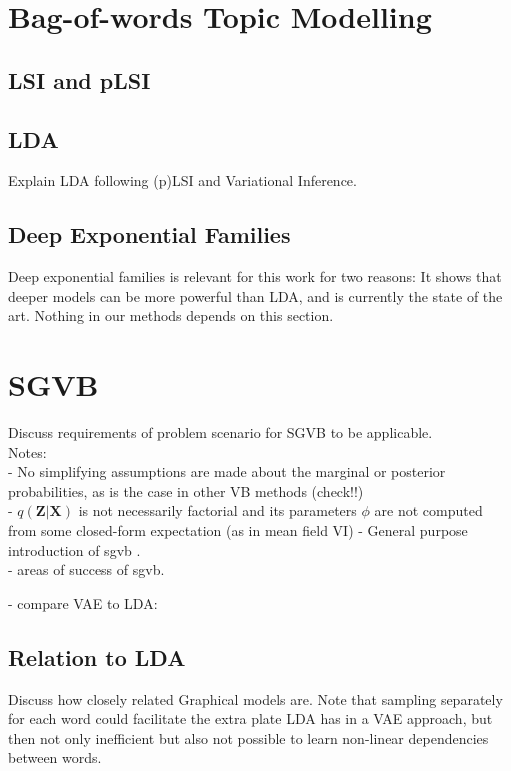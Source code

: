 \documentclass{report}
\begin{document}
\section{Bag-of-words Topic Modelling}

\subsection{LSI and pLSI}
\subsection{LDA}\label{LDA}
Explain LDA following (p)LSI and Variational Inference.
\subsection{Deep Exponential Families}\label{DEF}

Deep exponential families is relevant for this work for two reasons: It shows that deeper models can be more powerful than LDA, and is currently the state of the art. Nothing in our methods depends on this section.


\section{SGVB}\label{sgvb_section}

Discuss requirements of problem scenario for SGVB to be applicable. \\

Notes:\\
- No simplifying assumptions are made about the marginal or posterior probabilities, as is the case in other VB methods (check!!) \\
- $q(\mathbf{Z}|\mathbf{X})$ is not necessarily factorial and its parameters $\phi$ are not computed from some closed-form expectation (as in mean field VI)
- General purpose introduction of sgvb . \\

- areas of success of sgvb.

- compare VAE to LDA:

\subsection{Relation to LDA}

Discuss how closely related Graphical models are. Note that sampling separately for each word could facilitate the extra plate LDA has in a VAE approach, but then not only inefficient but also not possible to learn non-linear dependencies between words.
\end{document}
